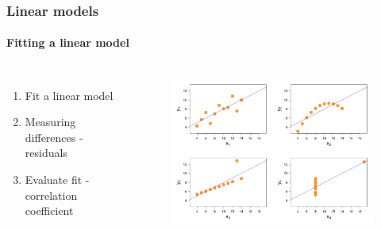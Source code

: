 \documentclass[aspectratio=43]{beamer}
\begin{document}
\begin{frame}
	
	\frametitle{Linear models}
	\framesubtitle{Fitting a linear model}
	
	\footnotesize
	
	\begin{columns}
		
		
		\begin{enumerate}
			\item Fit a linear model
			\item Measuring differences - residuals
			\item Evaluate fit  - correlation coefficient
		\end{enumerate}
		
		
		\begin{figure}[!htb]
			\includegraphics[width = \linewidth]{plots/part2/linear_model.png}
		\end{figure}
		
	\end{columns}

\end{frame}
\end{document}
